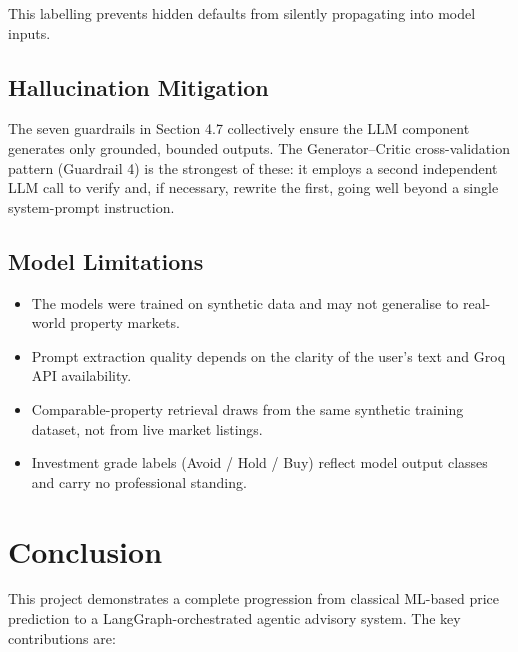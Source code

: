 \documentclass[12pt,a4paper]{article}
\begin{document}
This labelling prevents hidden defaults from silently propagating into model inputs.

\subsection{Hallucination Mitigation}

The seven guardrails in Section 4.7 collectively ensure the LLM component generates only grounded, bounded outputs. The Generator--Critic cross-validation pattern (Guardrail 4) is the strongest of these: it employs a second independent LLM call to verify and, if necessary, rewrite the first, going well beyond a single system-prompt instruction.

\subsection{Model Limitations}

\begin{itemize}[itemsep=3pt]
  \item The models were trained on synthetic data and may not generalise to real-world property markets.
  \item Prompt extraction quality depends on the clarity of the user's text and Groq API availability.
  \item Comparable-property retrieval draws from the same synthetic training dataset, not from live market listings.
  \item Investment grade labels (Avoid / Hold / Buy) reflect model output classes and carry no professional standing.
\end{itemize}

\section{Conclusion}

This project demonstrates a complete progression from classical ML-based price prediction to a LangGraph-orchestrated agentic advisory system. The key contributions are:
\end{document}
